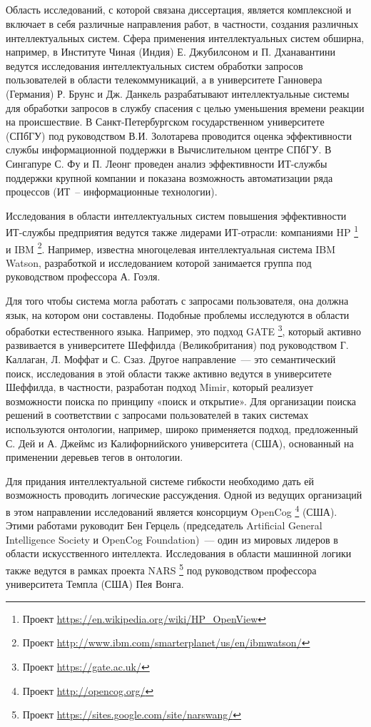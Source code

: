 \subsection*{}
Область исследований, с которой связана диссертация, является комплексной и включает в себя различные направления работ, в частности, создания различных интеллектуальных систем. Сфера применения интеллектуальных систем обширна, например, в Институте Чиная (Индия) Е. Джубилсоном и П. Дханавантини ведутся исследования интеллектуальных систем обработки запросов пользователей в области телекоммуникаций, а в университете Ганновера (Германия) Р. Брунс и Дж. Данкель разрабатывают интеллектуальные системы для обработки запросов в службу спасения с целью уменьшения времени реакции на происшествие. В Санкт-Петербургском государственном университете (СПбГУ) под руководством В.И. Золотарева проводится оценка эффективности службы информационной поддержки в Вычислительном центре СПбГУ. В Сингапуре С. Фу и П. Леонг проведен анализ эффективности ИТ-службы поддержки крупной компании и показана возможность автоматизации ряда процессов (ИТ~-- информационные технологии).\par
Исследования в области интеллектуальных систем повышения эффективности ИТ-службы предприятия ведутся также лидерами ИТ-отрасли: компаниями HP \footnote{Проект \url{https://en.wikipedia.org/wiki/HP_OpenView}} и IBM \footnote{Проект \url{http://www.ibm.com/smarterplanet/us/en/ibmwatson/}}. Например, известна многоцелевая интеллектуальная система IBM Watson, разработкой и исследованием которой занимается группа под руководством профессора А. Гоэля.  \par   
Для того чтобы система могла работать с запросами пользователя, она должна  язык, на котором они составлены. Подобные проблемы исследуются в области обработки естественного языка.  Например, это подход GATE \footnote{Проект \url{https://gate.ac.uk/}}, который активно развивается в университете Шеффилда (Великобритания) под руководством Г. Каллаган, Л. Моффат и С. Сзаз. Другое направление~--- это семантический поиск, исследования в этой области также активно ведутся в университете Шеффилда, в частности, разработан подход Mimir, который реализует возможности поиска по принципу «поиск и открытие». Для организации поиска решений в соответствии с запросами пользователей в таких системах используются онтологии, например, широко применяется подход, предложенный С. Дей и А. Джеймс из Калифорнийского университета (США), основанный на применении деревьев тегов в онтологии. \par
Для придания интеллектуальной системе гибкости необходимо дать ей возможность проводить логические рассуждения. Одной из ведущих организаций в этом направлении исследований является консорциум OpenCog \footnote{Проект \url{http://opencog.org/}} (США). Этими работами руководит Бен Герцель (председатель Artificial General Intelligence Society и OpenCog Foundation)~--- один из мировых лидеров в области искусственного интеллекта. Исследования в области машинной логики также ведутся в рамках проекта NARS \footnote{Проект \url{https://sites.google.com/site/narswang/}} под руководством профессора университета Темпла (США) Пея Вонга. \par 

